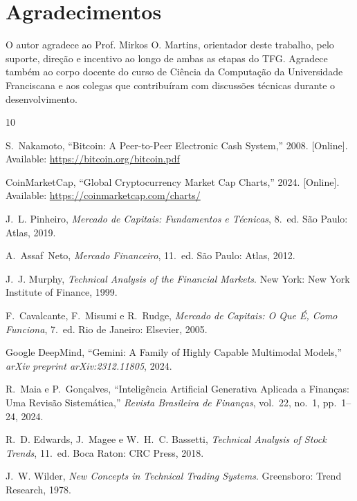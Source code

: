 \documentclass[conference]{IEEEtran}
\begin{document}
\section*{Agradecimentos}

O autor agradece ao Prof. Mirkos O. Martins, orientador deste trabalho, pelo suporte, direção e incentivo ao longo de ambas as etapas do TFG. Agradece também ao corpo docente do curso de Ciência da Computação da Universidade Franciscana e aos colegas que contribuíram com discussões técnicas durante o desenvolvimento.

\begin{thebibliography}{10}

S.~Nakamoto,
``Bitcoin: A Peer-to-Peer Electronic Cash System,''
2008. [Online]. Available: \url{https://bitcoin.org/bitcoin.pdf}

CoinMarketCap,
``Global Cryptocurrency Market Cap Charts,''
2024. [Online]. Available: \url{https://coinmarketcap.com/charts/}

J.~L. Pinheiro,
\textit{Mercado de Capitais: Fundamentos e Técnicas}, 8.~ed.
São Paulo: Atlas, 2019.

A.~Assaf~Neto,
\textit{Mercado Financeiro}, 11.~ed.
São Paulo: Atlas, 2012.

J.~J. Murphy,
\textit{Technical Analysis of the Financial Markets}.
New York: New York Institute of Finance, 1999.

F.~Cavalcante, F.~Misumi e R.~Rudge,
\textit{Mercado de Capitais: O Que É, Como Funciona}, 7.~ed.
Rio de Janeiro: Elsevier, 2005.

Google DeepMind,
``Gemini: A Family of Highly Capable Multimodal Models,''
\textit{arXiv preprint arXiv:2312.11805}, 2024.

R.~Maia e P.~Gonçalves,
``Inteligência Artificial Generativa Aplicada a Finanças: Uma Revisão Sistemática,''
\textit{Revista Brasileira de Finanças}, vol.~22, no.~1, pp.~1--24, 2024.

R.~D. Edwards, J.~Magee e W.~H.~C. Bassetti,
\textit{Technical Analysis of Stock Trends}, 11.~ed.
Boca Raton: CRC Press, 2018.

J.~W. Wilder,
\textit{New Concepts in Technical Trading Systems}.
Greensboro: Trend Research, 1978.


\end{thebibliography}
\end{document}

